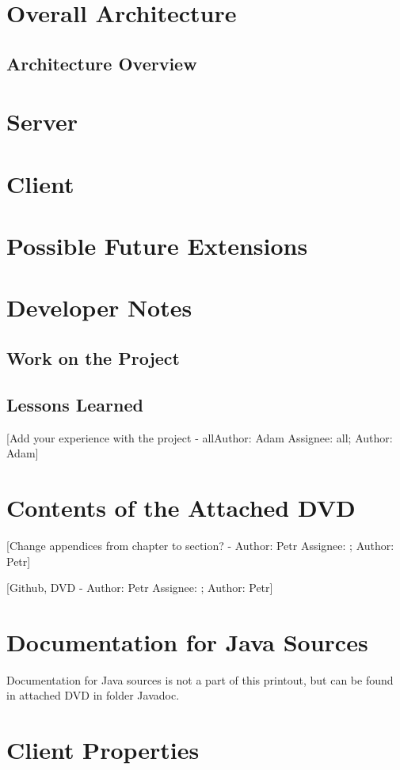 \documentclass[12pt,a4paper]{report}
\makeatletter
\newcommand{\comment}[3][\@empty]{
  {\color{magenta}[#3 - }
  {\color{green}\ifx\@empty#1\relax Author: #2 \else Assignee: #1; Author: #2\fi}{\color{magenta}]}
}
\makeatother
\begin{document}
\chapter{Overall Architecture}
\section{Architecture Overview}


\chapter{Server}


\chapter{Client}


%


\chapter{Possible Future Extensions}


\chapter{Developer Notes}
\section{Work on the Project}


\section{Lessons Learned}
\comment[all]{Adam}{Add your experience with the project}

\appendix
\chapter{Contents of the Attached DVD}

\comment{Petr}{Change appendices from chapter to section?}

\comment{Petr}{Github, DVD}

\chapter{Documentation for Java Sources}
Documentation for Java sources is not a part of this printout, but can be found
in attached DVD in folder Javadoc.

\chapter{Client Properties}

\label{app:ClientProperties}
\end{document}
